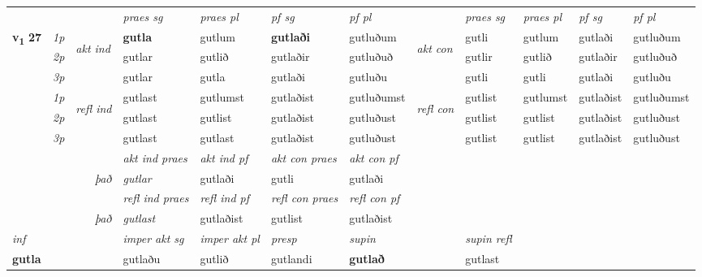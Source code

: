 \begin{longtable}[l]{X>{\footnotesize\itshape}llXXXXlXXXX}
 & &   & \textit{praes sg}  & \textit{praes pl}    & \textit{ pf sg} & \textit{pf pl} & & \textit{praes sg}  & \textit{praes pl}    & \textit{pf sg} & \textit{pf pl }  \\ \cmidrule{4-7} \cmidrule{9-12}
 \multirow{2}{*}{{{\textbf{v{\textsubscript{1}}} \Large{\textbf{27}}}}}  & 1p & \multirow{3}{*}{\begin{turn}{90}\textit{akt ind}\end{turn}} & \textbf{gutla} & gutlum & \textbf{gutlaði} & gutluðum & \multirow{3}{*}{\begin{turn}{90}\textit{akt con}\end{turn}} &gutli & gutlum & gutlaði & gutluðum\\*
 & 2p &  &  gutlar  & gutlið & gutlaðir & gutluðuð & & gutlir & gutlið & gutlaðir & gutluðuð \\*
 & 3p &  & gutlar & gutla & gutlaði & gutluðu & & gutli & gutli& gutlaði & gutluðu \\*
\cmidrule{4-7} \cmidrule{9-12}
 & 1p & \multirow{3}{*}{\begin{turn}{90}\textit{refl ind}\end{turn}}  & gutlast & gutlumst & gutlaðist & gutluðumst & \multirow{3}{*}{\begin{turn}{90}\textit{refl con}\end{turn}}  &gutlist & gutlumst & gutlaðist & gutluðumst \\*
 & 2p &  & gutlast & gutlist & gutlaðist & gutluðust & &gutlist & gutlist & gutlaðist & gutluðust \\*
 & 3p  & & gutlast & gutlast & gutlaðist & gutluðust & & gutlist & gutlist& gutlaðist & gutluðust \\*
\cmidrule{4-7} \cmidrule{9-12}

   && &  \textit{akt ind praes} & \textit{akt ind pf} & \textit{akt con praes} & \textit{akt con pf} \\*
\multicolumn{3}{r}{\textit{það}} & gutlar & gutlaði & gutli & gutlaði \\*

\cmidrule{4-7}
 & && \textit{refl ind praes} & \textit{refl ind pf} & \textit{refl con praes} & \textit{refl con pf} \\*
\multicolumn{3}{r}{\textit{það}}& gutlast & gutlaðist & gutlist & gutlaðist \\*

\cmidrule{4-7}
   {\textit{inf}} & &  & \textit{imper akt sg} & \textit{imper akt pl}   & \textit{presp} & \textit{supin} && \textit{supin refl}  \\*
  {\textbf{gutla}} & && gutlaðu  & gutlið   & gutlandi &  \textbf{gutlað} && gutlast  \\*


\end{longtable}
